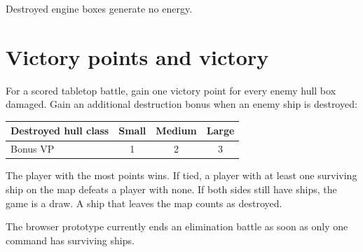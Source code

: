 Destroyed engine boxes generate no energy.

\section{Victory points and victory}

For a scored tabletop battle, gain one victory point for every enemy hull box damaged. Gain an additional destruction bonus when an enemy ship is destroyed:

\begin{center}
\begin{tabular}{lccc}\toprule
Destroyed hull class & Small & Medium & Large\\\midrule
Bonus VP & 1 & 2 & 3\\\bottomrule
\end{tabular}
\end{center}

The player with the most points wins. If tied, a player with at least one surviving ship on the map defeats a player with none. If both sides still have ships, the game is a draw. A ship that leaves the map counts as destroyed.

The browser prototype currently ends an elimination battle as soon as only one command has surviving ships.
